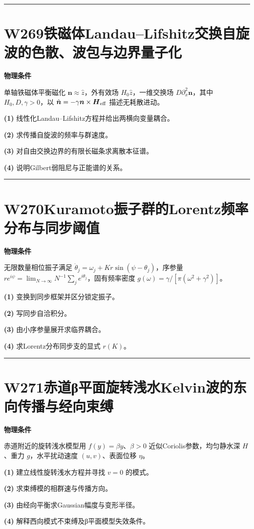 \documentclass[UTF8,a4paper,11pt,oneside,openany]{ctexbook}
\begin{document}
\par\bigskip\hrule\bigskip
\section*{W269\quad 铁磁体Landau–Lifshitz交换自旋波的色散、波包与边界量子化}
\textbf{物理条件}\par 单轴铁磁体平衡磁化 \(\boldsymbol n\approx\hat z\)，外有效场 \(H_0\hat z\)，一维交换场 \(D\partial_x^2\boldsymbol n\)，其中 \(H_0,D,\gamma>0\)，以 \(\dot{\boldsymbol n}=-\gamma\boldsymbol n\times\boldsymbol H_{\rm eff}\) 描述无耗散进动。
\par\noindent\textbf{(1)} 线性化Landau–Lifshitz方程并给出两横向变量耦合。
\par\noindent\textbf{(2)} 求传播自旋波的频率与群速度。
\par\noindent\textbf{(3)} 对自由交换边界的有限长磁条求离散本征谱。
\par\noindent\textbf{(4)} 说明Gilbert弱阻尼与正能谱的关系。

\par\bigskip\hrule\bigskip
\section*{W270\quad Kuramoto振子群的Lorentz频率分布与同步阈值}
\textbf{物理条件}\par 无限数量相位振子满足 \(\dot\theta_j=\omega_j+K r\sin(\psi-\theta_j)\)，序参量 \(re^{i\psi}=\lim_{N\to\infty}N^{-1}\sum_je^{i\theta_j}\)，固有频率密度 \(g(\omega)=\gamma/[\pi(\omega^2+\gamma^2)]\)。
\par\noindent\textbf{(1)} 变换到同步框架并区分锁定振子。
\par\noindent\textbf{(2)} 写同步自洽积分。
\par\noindent\textbf{(3)} 由小序参量展开求临界耦合。
\par\noindent\textbf{(4)} 求Lorentz分布同步支的显式 \(r(K)\)。

\par\bigskip\hrule\bigskip
\section*{W271\quad 赤道β平面旋转浅水Kelvin波的东向传播与经向束缚}
\textbf{物理条件}\par 赤道附近的旋转浅水模型用 \(f(y)=\beta y\)、\(\beta>0\) 近似Coriolis参数，均匀静水深 \(H\)、重力 \(g\)，水平扰动速度 \((u,v)\)、表面位移 \(\eta\)。
\par\noindent\textbf{(1)} 建立线性旋转浅水方程并寻找 \(v=0\) 的模式。
\par\noindent\textbf{(2)} 求束缚模的相群速与传播方向。
\par\noindent\textbf{(3)} 由经向平衡求Gaussian幅度与变形半径。
\par\noindent\textbf{(4)} 解释西向模式不束缚及β平面模型失效条件。
\end{document}
